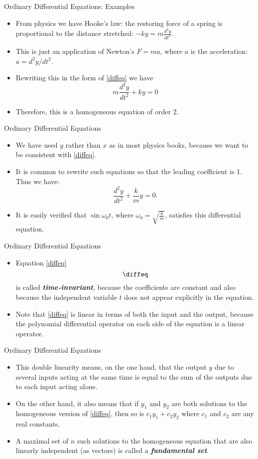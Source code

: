 \begin{frame}
Ordinary Differential Equations: Examples
 \begin{itemize}
 \item From physics we have Hooke's law: the restoring force of a
 spring is proportional to the distance stretched:  $-ky = m\frac{d^2y}{dt^2}$.
 \item This is just an application of Newton's $F=ma$, where $a$
 is the acceleration: $a=d^2y/dt^2$.
 \item Rewriting this in the form of \eqref{diffeq} we have
 \[m\frac{d^2y}{dt^2}+ky=0\]
 \item Therefore, this is a homogeneous equation of order 2.
\end{itemize}
\end{frame}
\begin{frame}
Ordinary Differential Equations
 \begin{itemize}
 \item We have used $y$ rather than $x$ as in most physics books,
 because we want to be consistent with \eqref{diffeq}.
 \item It is common to rewrite such equations so that the leading
 coefficient is 1.  Thus we have:
 \[\frac{d^2y}{dt^2}+\frac{k}{m}y=0.\]
 \item It is easily verified that $\sin\omega_0 t$, where
 $\omega_0=\sqrt{\frac{k}{m}}$, satisfies this differential equation.
\end{itemize}
\end{frame}
\begin{frame}
Ordinary Differential Equations
 \begin{itemize}
 \item Equation \eqref{diffeq}
 \[\diffeq\]
 is called
 \textit{\textbf{time-invariant}}, because the coefficients are
 constant and also because the independent variable $t$ does not
 appear explicitly in the equation.
 \item Note that \eqref{diffeq} is linear in terms of both the
 input and the output, because the polynomial differential
 operator on each side of the equation is a linear operator.
\end{itemize}
\end{frame}
\begin{frame}
Ordinary Differential Equations
 \begin{itemize}
 \item This double linearity means, on the one hand, that the output $y$ due to several inputs acting
 at the same time is equal to the sum of the outputs due to each
 input acting alone.
 \item On the other hand, it also means that if $y_1$ and $y_2$
 are both solutions to the homogeneous version of \eqref{diffeq},
 then so is $c_1y_1+c_2y_2$ where $c_1$ and $c_2$ are any real
 constants.
 \item A maximal set of $n$ such solutions to the homogeneous
 equation that are also linearly independent (as vectors) is
 called a \textit{\textbf{fundamental set}}.
\end{itemize}
\end{frame}
